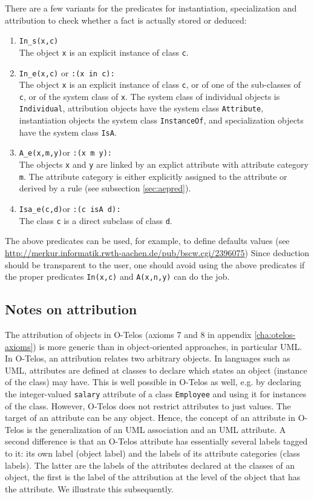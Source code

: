 There are a few variants for the predicates for instantiation, specialization and attribution 
to check whether a fact is actually stored or deduced: 

\begin{enumerate}
\item {\tt In\_s(x,c)}\\
The object {\tt x} is an explicit instance of class {\tt c}.
\item {\tt In\_e(x,c)} or {\tt :(x in c):}\\
The object {\tt x} is an explicit instance of class {\tt c}, or of one of the
 sub-classes of {\tt c}, or of the system class of {\tt x}. The system class of
individual objects is {\tt Individual}, attribution objects  have the system class {\tt Attribute},
instantiation objects the system class {\tt InstanceOf}, and specialization objects have the system
class {\tt IsA}.
\item {\tt A\_e(x,m,y)}or {\tt :(x m y):}\\
The objects {\tt x} and {\tt y} are linked by an explict attribute with attribute category {\tt m}.
The attribute category is either explicitly assigned to the attribute or derived by a rule (see 
subsection \ref{sec:aepred}).
\item {\tt Isa\_e(c,d)}or {\tt :(c isA d):}\\
The class {\tt c} is a direct subclass of class {\tt d}.
\end{enumerate}

The above predicates can be used, for example,
to define defaults values (see
\url{http://merkur.informatik.rwth-aachen.de/pub/bscw.cgi/2396075})
Since deduction should be transparent to the user,
one should avoid using the above predicates if the proper predicates {\tt In(x,c)} and
{\tt A(x,n,y)} can do the job.


\subsection{Notes on attribution}
The attribution of objects in O-Telos (axioms 7 and 8 in appendix \ref{cha:otelos-axioms})
is more generic than in object-oriented approaches,
in particular UML. In O-Telos, an attribution relates two arbitrary objects. In languages such as UML,
attributes are defined at classes to declare which states an object (instance of the class) may
have. This is well possible in O-Telos as well, e.g. by declaring the integer-valued {\tt salary} attribute
of a class {\tt Employee} and using it for instances of the class. However, O-Telos does not
restrict attributes to just values. The target of an attribute can be any object. Hence, the
concept of an attribute in O-Telos is the generalization of an UML association and an UML attribute.
A second difference is that an O-Telos attribute has essentially several labels tagged to it: its own
label (object label) and the labels of its attribute categories (class labels). 
The latter are the labels of the attributes declared
at the classes of an object, the first is the label of the attribution at the level of the object
that has the attribute. We illustrate this subsequently.

